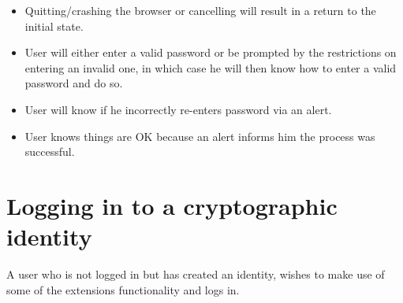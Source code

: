 \begin{desc}
\begin{itemize}
            \item Quitting/crashing the browser or cancelling will result in a return to the initial state.
            
            \item User will either enter a valid password or be prompted by the restrictions on entering an invalid one, in which case he will then know how to enter a valid password and do so.
            
            \item User will know if he incorrectly re-enters password via an alert.
            
            \item User knows things are OK because an alert informs him the process was successful.
            
        \end{itemize}
\end{desc}

\section{Logging in to a cryptographic identity}
\label{app:cw:log}
A user who is not logged in but has created an identity, wishes to make use of some of the extensions functionality and logs in.

